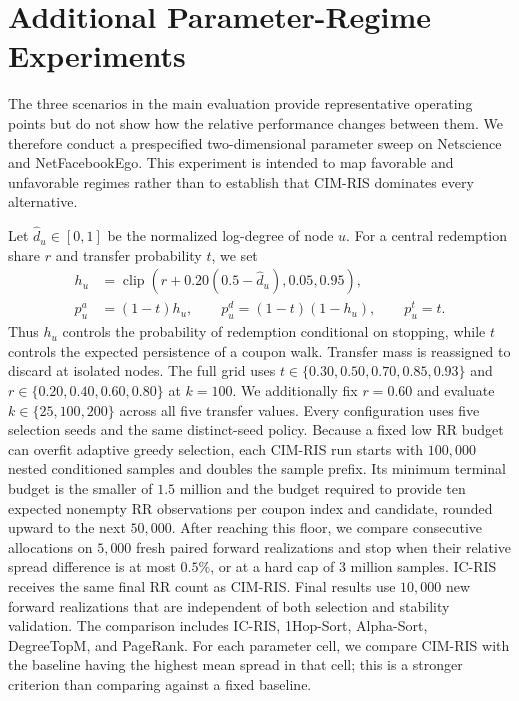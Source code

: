 \documentclass[sigconf,balance=false]{acmart}
\newcommand{\CIMRIS}{\textsc{CIM-RIS}}
\begin{document}
\appendix
\section{Additional Parameter-Regime Experiments}
\label{app:parameter-sweep}

The three scenarios in the main evaluation provide representative operating
points but do not show how the relative performance changes between them.
We therefore conduct a prespecified two-dimensional parameter sweep on
Netscience and NetFacebookEgo. This experiment is intended to map favorable
and unfavorable regimes rather than to establish that \CIMRIS{} dominates
every alternative.

Let $\hat d_u\in[0,1]$ be the normalized log-degree of node $u$. For a
central redemption share $r$ and transfer probability $t$, we set
\[
\begin{aligned}
  h_u &=
    \operatorname{clip}\!\left(r+0.20(0.5-\hat d_u),0.05,0.95\right),\\
  p_u^a&=(1-t)h_u,\qquad
  p_u^d=(1-t)(1-h_u),\qquad
  p_u^t=t.
\end{aligned}
\]
Thus $h_u$ controls the probability of redemption conditional on stopping,
while $t$ controls the expected persistence of a coupon walk. Transfer mass
is reassigned to discard at isolated nodes. The full grid uses
$t\in\{0.30,0.50,0.70,0.85,0.93\}$ and
$r\in\{0.20,0.40,0.60,0.80\}$ at $k=100$. We additionally fix $r=0.60$ and
evaluate $k\in\{25,100,200\}$ across all five transfer values. Every
configuration uses five selection seeds and the same distinct-seed policy.
Because a fixed low RR budget can overfit adaptive greedy selection, each
\CIMRIS{} run starts with $100{,}000$ nested conditioned samples and doubles
the sample prefix. Its minimum terminal budget is the smaller of $1.5$
million and the budget required to provide ten expected nonempty RR
observations per coupon index and candidate, rounded upward to the next
$50{,}000$. After reaching this floor, we compare consecutive allocations on
$5{,}000$ fresh paired forward realizations and stop when their relative
spread difference is at most $0.5\%$, or at a hard cap of $3$ million
samples. IC-RIS receives the same final RR count as \CIMRIS{}. Final results
use $10{,}000$ new forward realizations that are independent of both selection
and stability validation. The comparison includes IC-RIS, 1Hop-Sort,
Alpha-Sort, DegreeTopM, and PageRank. For each parameter cell, we compare
\CIMRIS{} with the baseline having the highest mean spread in that cell; this
is a stronger criterion than comparing against a fixed baseline.
\end{document}
